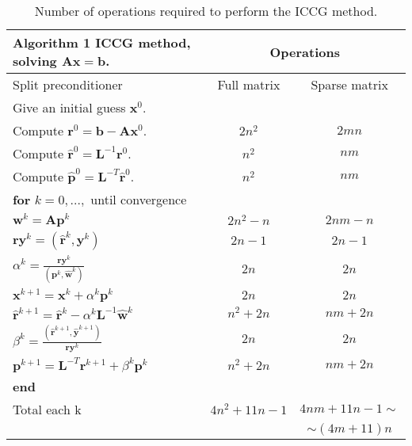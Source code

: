 \documentclass[12pt]{article}
\begin{document}
{ \begin{table}[!h]
\begin{tabular}{ |l|c|c| } 
\hline
  \textbf{Algorithm 1} ICCG method, solving $\mathbf{A}\mathbf{x}=\mathbf{b}$.& \multicolumn{2}{c|}{Operations}\\
  \hline
Split preconditioner &Full matrix&Sparse matrix\\
 \hline
Give an initial guess $\mathbf{x}^0$. &&\\
Compute $\mathbf{r}^0=\mathbf{b}-\mathbf{A}\mathbf{x}^0$.&$2n^2$&$2mn$\\
Compute $\hat{\mathbf{r}}^0=\mathbf{L}^{-1}\mathbf{r}^0$.&$n^2$&$nm$\\
Compute $\hat{\mathbf{p}}^0=\mathbf{L}^{-T}\hat{\mathbf{r}}^0$.&$n^2$&$nm$\\
\hline
\hspace{0.5cm}\textbf{for} $k=0,...,$ until convergence&&\\
\hspace{1cm} $\mathbf{w}^k=\mathbf{A}\mathbf{p}^k$&$2n^2-n$&$2nm-n$\\
 \hspace{1cm} $\mathbf{ry}^{k}=(\hat{\mathbf{r}}^{k},\mathbf{y}^{k})$&$2n-1$&$2n-1$\\
 \hspace{1cm} $\alpha^k=\frac{\mathbf{ry}^{k}}{(\mathbf{p}^k,\hat{\mathbf{w}}^k)}$&$2n$&$2n$\\
\hspace{1cm} $\mathbf{x}^{k+1}=\mathbf{x}^k+\alpha^k\mathbf{p}^k$&$2n$&$2n$\\
\hspace{1cm}$\hat{\mathbf{r}}^{k+1}=\hat{\mathbf{r}}^k-\alpha^k\mathbf{L}^{-1}\hat{\mathbf{w}}^k$&$n^2+2n$&$nm+2n$\\
\hspace{1cm}$ \beta^k=\frac{(\hat{\mathbf{r}}^{k+1},\hat{\mathbf{y}}^{k+1})}{\mathbf{ry}^{k}}$&$2n$&$2n$\\
\hspace{1cm}$\mathbf{p}^{k+1}=\mathbf{L}^{-T}\mathbf{r}^{k+1}+\beta^k\mathbf{p}^k$&$n^2+2n$&$nm+2n$\\

\hspace{0.5cm}\textbf{end}&&\\
\hline
Total each k&$4n^2+11n-1$&$4nm+11n-1\sim$\\
&&$\sim (4m+11)n$\\
\hline
\end{tabular}\caption{Number of operations required to perform the ICCG method.}\label{table:noi}
\end{table}



}
\end{document}

